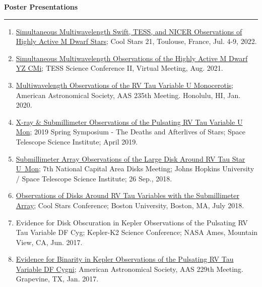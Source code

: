 \documentclass[letter,11pt]{article}
\begin{document}
\noindent
{\bf Poster Presentations} \\
\vspace{-10mm}
\begin{center}
\rule{\textwidth}{0.2mm}
\end{center}
\vspace{-3mm}
\noindent
\begin{enumerate}[\bfseries 1.] 

\item \href{https://coolstars21.github.io/docs/CS21booklet.pdf}{Simultaneous Multiwavelength Swift, TESS, and NICER Observations of Highly Active M Dwarf Stars}; Cool Stars 21, Toulouse, France, Jul. 4-9, 2022.

\item \href{https://zenodo.org/record/5142127#.YmbZsJPMJCV}{Simultaneous Multiwavelength Observations of the Highly Active M Dwarf YZ CMi}; TESS Science Conference II, Virtual Meeting, Aug. 2021.

\item \href{https://ui.adsabs.harvard.edu/abs/2020AAS...23510607V/abstract}{Multiwavelength Observations of the RV Tau Variable U Monocerotis}; American Astronomical Society, AAS 235th Meeting.  Honolulu, HI, Jan.  2020.

\item \href{http://www.stsci.edu/~ofox/posters2019/}{X-ray \& Submillimeter Observations of the Pulsating RV Tau Variable U Mon}; 2019 Spring Symposium - The Deaths and Afterlives of Stars; Space Telescope Science Institute; April 2019.

\item \href{https://sites.google.com/view/ncad7-at-jhu/program?authuser=0}{Submillimeter Array Observations of the Large Disk Around RV Tau Star U~Mon}; 7th National Capital Area Disks Meeting; Johns Hopkins University / Space Telescope Science Institute; 26 Sep., 2018.

\item \href{http://coolstars20.cfa.harvard.edu/abstracts.html#posters}{Observations of Disks Around RV Tau Variables with the Submillimeter Array}; Cool Stars Conference; Boston University, Boston, MA, July 2018.

\item Evidence for Disk Obscuration in Kepler Observations of the Pulsating RV Tau Variable DF Cyg; Kepler-K2 Science Conference; NASA Ames, Mountain View, CA, Jun. 2017.

\item \href{http://adsabs.harvard.edu/abs/2017AAS...22915210V}{Evidence for Binarity in Kepler Observations of the Pulsating RV Tau Variable DF Cygni}; American  Astronomical  Society,  AAS  229th  Meeting. Grapevine, TX, Jan. 2017.


\end{enumerate}
\end{document}
